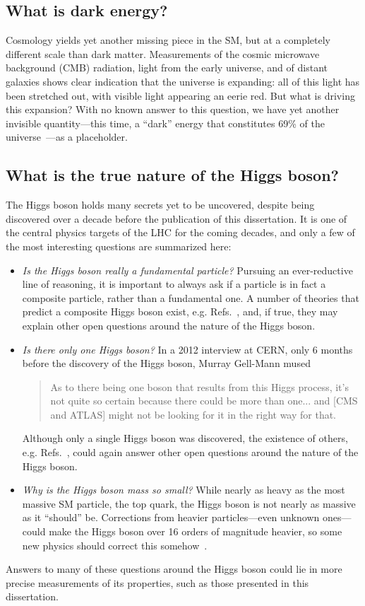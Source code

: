 \subsection{What is dark energy?}
Cosmology yields yet another missing piece in the SM, but at a completely different scale than dark matter. 
Measurements of the cosmic microwave background (CMB) radiation, light from the early universe, and of distant galaxies shows clear indication that the universe is expanding: all of this light has been stretched out, with visible light appearing an eerie red. 
But what is driving this expansion? 
With no known answer to this question, we have yet another invisible quantity---this time, a ``dark'' energy that constitutes 69\% of the universe~\cite{PlanckDM}---as a placeholder.

\subsection{What is the true nature of the Higgs boson?}
The Higgs boson holds many secrets yet to be uncovered, despite being discovered over a decade before the publication of this dissertation. 
It is one of the central physics targets of the LHC for the coming decades, and only a few of the most interesting questions are summarized here:
\begin{itemize}
    \item{
        \textit{Is the Higgs boson really a fundamental particle?}
        Pursuing an ever-reductive line of reasoning, it is important to always ask if a particle is in fact a composite particle, rather than a fundamental one. 
        A number of theories that predict a composite Higgs boson exist, e.g. Refs.~\cite{Kaplan:1983sm, Arkani-Hamed:2002ikv, Contino:2003ve}, and, if true, they may explain other open questions around the nature of the Higgs boson.
    }
    \item{
        \textit{Is there only one Higgs boson?}
        In a 2012 interview at CERN, only 6 months before the discovery of the Higgs boson, Murray Gell-Mann mused
        \begin{quote}
            As to there being one boson that results from this Higgs process, it's not quite so certain because there could be more than one... 
            and [CMS and ATLAS] might not be looking for it in the right way for that.
        \end{quote}
        Although only a single Higgs boson was discovered, the existence of others, e.g. Refs.~\cite{Branco:2011iw, Gunion:2005ja, Grzadkowski:2009bt}, could again answer other open questions around the nature of the Higgs boson.
    }
    \item{
        \textit{Why is the Higgs boson mass so small?}
        While nearly as heavy as the most massive SM particle, the top quark, the Higgs boson is not nearly as massive as it ``should'' be. 
        Corrections from heavier particles---even unknown ones---could make the Higgs boson over 16 orders of magnitude heavier, so some new physics should correct this somehow~\cite{Susskind:1978ms, tHooft:1979rat}.
    }
\end{itemize}
Answers to many of these questions around the Higgs boson could lie in more precise measurements of its properties, such as those presented in this dissertation.